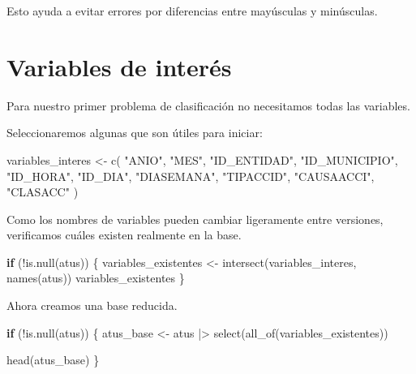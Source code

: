 \documentclass[
  11pt,
  letterpaper,
]{book}
\newenvironment{Shaded}{\begin{snugshade}}{\end{snugshade}}
\newcommand{\ControlFlowTok}[1]{\textcolor[rgb]{0.00,0.23,0.31}{\textbf{#1}}}
\newcommand{\FunctionTok}[1]{\textcolor[rgb]{0.28,0.35,0.67}{#1}}
\newcommand{\NormalTok}[1]{\textcolor[rgb]{0.00,0.23,0.31}{#1}}
\newcommand{\OtherTok}[1]{\textcolor[rgb]{0.00,0.23,0.31}{#1}}
\newcommand{\SpecialCharTok}[1]{\textcolor[rgb]{0.37,0.37,0.37}{#1}}
\newcommand{\StringTok}[1]{\textcolor[rgb]{0.13,0.47,0.30}{#1}}
\begin{document}
Esto ayuda a evitar errores por diferencias entre mayúsculas y
minúsculas.

\section{Variables de interés}\label{variables-de-interuxe9s}

Para nuestro primer problema de clasificación no necesitamos todas las
variables.

Seleccionaremos algunas que son útiles para iniciar:

\begin{Shaded}
\begin{Highlighting}[]
\NormalTok{variables\_interes }\OtherTok{\textless{}{-}} \FunctionTok{c}\NormalTok{(}
  \StringTok{"ANIO"}\NormalTok{,}
  \StringTok{"MES"}\NormalTok{,}
  \StringTok{"ID\_ENTIDAD"}\NormalTok{,}
  \StringTok{"ID\_MUNICIPIO"}\NormalTok{,}
  \StringTok{"ID\_HORA"}\NormalTok{,}
  \StringTok{"ID\_DIA"}\NormalTok{,}
  \StringTok{"DIASEMANA"}\NormalTok{,}
  \StringTok{"TIPACCID"}\NormalTok{,}
  \StringTok{"CAUSAACCI"}\NormalTok{,}
  \StringTok{"CLASACC"}
\NormalTok{)}
\end{Highlighting}
\end{Shaded}

Como los nombres de variables pueden cambiar ligeramente entre
versiones, verificamos cuáles existen realmente en la base.

\begin{Shaded}
\begin{Highlighting}[]
\ControlFlowTok{if}\NormalTok{ (}\SpecialCharTok{!}\FunctionTok{is.null}\NormalTok{(atus)) \{}
\NormalTok{  variables\_existentes }\OtherTok{\textless{}{-}} \FunctionTok{intersect}\NormalTok{(variables\_interes, }\FunctionTok{names}\NormalTok{(atus))}
\NormalTok{  variables\_existentes}
\NormalTok{\}}
\end{Highlighting}
\end{Shaded}

Ahora creamos una base reducida.

\begin{Shaded}
\begin{Highlighting}[]
\ControlFlowTok{if}\NormalTok{ (}\SpecialCharTok{!}\FunctionTok{is.null}\NormalTok{(atus)) \{}
\NormalTok{  atus\_base }\OtherTok{\textless{}{-}}\NormalTok{ atus }\SpecialCharTok{|\textgreater{}}
    \FunctionTok{select}\NormalTok{(}\FunctionTok{all\_of}\NormalTok{(variables\_existentes))}

  \FunctionTok{head}\NormalTok{(atus\_base)}
\NormalTok{\}}
\end{Highlighting}
\end{Shaded}
\end{document}
